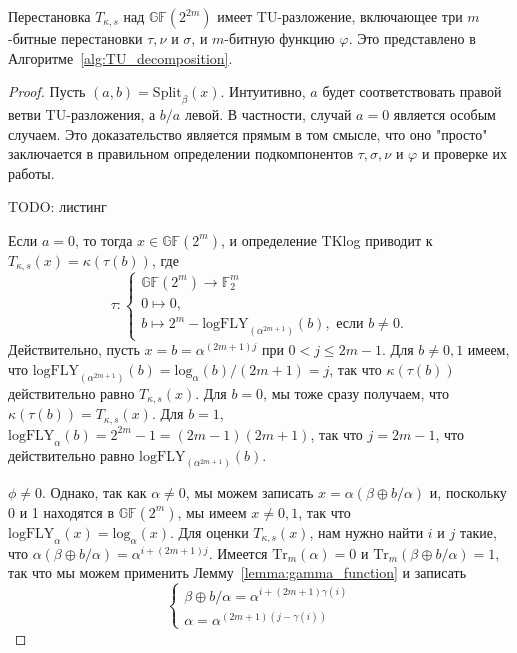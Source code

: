 \begin{theorem}
Перестановка \(T_{\kappa, s}\) над \(\mathbb{GF}(2^{2m})\) имеет TU-разложение, включающее три \(m\)-битные перестановки \(\tau, \nu\) и \(\sigma\), и \(m\)-битную функцию \(\varphi\). Это представлено в Алгоритме~\ref{alg:TU_decomposition}.
\end{theorem}

\begin{proof}
Пусть \((a, b) = \mathrm{Split}_{\beta}(x)\). Интуитивно, \(a\) будет соответствовать правой ветви TU-разложения, а \(b/a\) левой. В частности, случай \(a = 0\) является особым случаем. Это доказательство является прямым в том смысле, что оно "просто" заключается в правильном определении подкомпонентов \(\tau, \sigma, \nu\) и \(\varphi\) и проверке их работы.

TODO: листинг

Если \(a = 0\), то тогда \(x \in \mathbb{GF}(2^m)\), и определение TKlog приводит к \(T_{\kappa, s}(x) = \kappa(\tau(b))\), где
\[
\tau : 
\begin{cases}
\mathbb{GF}(2^m) \to \mathbb{F}^m_2 \\
0 \mapsto 0, \\
b \mapsto 2^m - \mathrm{logFLY}_{(\alpha^{2m+1})}(b), \text{ если } b \neq 0.
\end{cases}
\]
Действительно, пусть \(x = b = \alpha^{(2m+1)j}\) при \(0 < j \leq 2m - 1\). Для \(b \neq 0, 1\) имеем, что \(\mathrm{logFLY}_{(\alpha^{2m+1})}(b) = \mathrm{log}_{\alpha}(b)/(2m + 1) = j\), так что \(\kappa(\tau(b))\) действительно равно \(T_{\kappa, s}(x)\). Для \(b = 0\), мы тоже сразу получаем, что \(\kappa(\tau(b)) = T_{\kappa, s}(x)\). Для \(b = 1\), \(\mathrm{logFLY}_{\alpha}(b) = 2^{2m} - 1 = (2m - 1)(2m + 1)\), так что \(j = 2m - 1\), что действительно равно \(\mathrm{logFLY}_{(\alpha^{2m+1})}(b)\).

\(\phi \neq 0\). Однако, так как \(\alpha \neq 0\), мы можем записать \(x = \alpha(\beta \oplus b/\alpha)\) и, поскольку 0 и 1 находятся в \(\mathbb{GF}(2^m)\), мы имеем \(x \neq 0, 1\), так что \(\mathrm{logFLY}_{\alpha}(x) = \mathrm{log}_{\alpha}(x)\). Для оценки \(T_{\kappa,s}(x)\), нам нужно найти \(i\) и \(j\) такие, что \(\alpha(\beta \oplus b/\alpha) = \alpha^{i+(2m+1)j}\). Имеется \(\mathrm{Tr}_m(\alpha) = 0\) и \(\mathrm{Tr}_m(\beta \oplus b/\alpha) = 1\), так что мы можем применить Лемму~\ref{lemma:gamma_function} и записать
\[
\begin{cases}
\beta \oplus b/\alpha = \alpha^{i+(2m+1)\gamma(i)} \\
\alpha = \alpha^{(2m+1)(j-\gamma(i))}
\end{cases}
\]


\end{proof}
